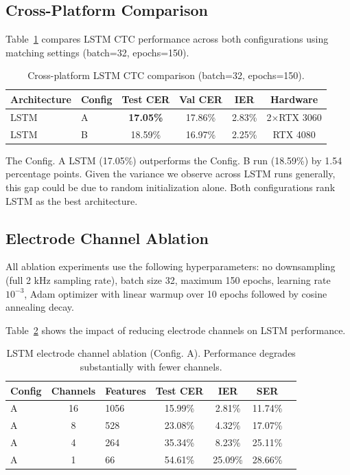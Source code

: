 \documentclass{article}
\begin{document}
\subsection{Cross-Platform Comparison}

Table~\ref{tab:cross_platform} compares LSTM CTC performance across both configurations using matching settings (batch=32, epochs=150).

\begin{table}[h]
\centering
\caption{Cross-platform LSTM CTC comparison (batch=32, epochs=150).}
\label{tab:cross_platform}
\begin{tabular}{llcccc}
\toprule
\textbf{Architecture} & \textbf{Config} & \textbf{Test CER} & \textbf{Val CER} & \textbf{IER} & \textbf{Hardware} \\
\midrule
LSTM & A & \textbf{17.05\%} & 17.86\% & 2.83\% & 2$\times$RTX 3060 \\
LSTM & B & 18.59\% & 16.97\% & 2.25\% & RTX 4080 \\
\bottomrule
\end{tabular}
\end{table}

The Config. A LSTM (17.05\%) outperforms the Config. B run (18.59\%) by 1.54 percentage points. Given the variance we observe across LSTM runs generally, this gap could be due to random initialization alone. Both configurations rank LSTM as the best architecture.

\subsection{Electrode Channel Ablation}

All ablation experiments use the following hyperparameters: no downsampling (full 2 kHz sampling rate), batch size 32, maximum 150 epochs, learning rate $10^{-3}$, Adam optimizer with linear warmup over 10 epochs followed by cosine annealing decay.

Table~\ref{tab:ablation} shows the impact of reducing electrode channels on LSTM performance.

\begin{table}[h]
\centering
\caption{LSTM electrode channel ablation (Config. A). Performance degrades substantially with fewer channels.}
\label{tab:ablation}
\begin{tabular}{lclcccc}
\toprule
\textbf{Config} & \textbf{Channels} & \textbf{Features} & \textbf{Test CER} & \textbf{IER} & \textbf{SER} \\
\midrule
A & 16 & 1056 & 15.99\% & 2.81\% & 11.74\% \\
A & 8 & 528 & 23.08\% & 4.32\% & 17.07\% \\
A & 4 & 264 & 35.34\% & 8.23\% & 25.11\% \\
A & 1 & 66 & 54.61\% & 25.09\% & 28.66\% \\
\bottomrule
\end{tabular}
\end{table}
\end{document}
